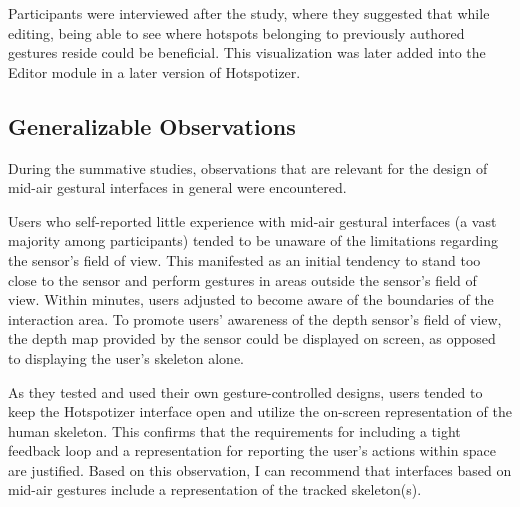 Participants were interviewed after the study, where they suggested that while editing, being able to see where hotspots belonging to previously authored gestures reside could be beneficial. This visualization was later added into the Editor module in a later version of Hotspotizer.

\subsection{Generalizable Observations}

During the summative studies, observations that are relevant for the design of mid-air gestural interfaces in general were encountered.

Users who self-reported little experience with mid-air gestural interfaces (a vast majority among participants) tended to be unaware of the limitations regarding the sensor’s field of view. This manifested as an initial tendency to stand too close to the sensor and perform gestures in areas outside the sensor’s field of view. Within minutes, users adjusted to become aware of the boundaries of the interaction area. To promote users' awareness of the depth sensor's field of view, the depth map provided by the sensor could be displayed on screen, as opposed to displaying the user's skeleton alone.

As they tested and used their own gesture-controlled designs, users tended to keep the Hotspotizer interface open and utilize the on-screen representation of the human skeleton. This confirms that the requirements for including a tight feedback loop and a representation for reporting the user’s actions within space are justified. Based on this observation, I can recommend that interfaces based on mid-air gestures include a representation of the tracked skeleton(s).

